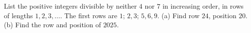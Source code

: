 List the positive integers divisible by neither $4$ nor $7$ in increasing order, in rows of lengths $1,2,3,\ldots$. The first rows are $1$; $2,3$; $5,6,9$. (a) Find row $24$, position $20$. (b) Find the row and position of $2025$.
